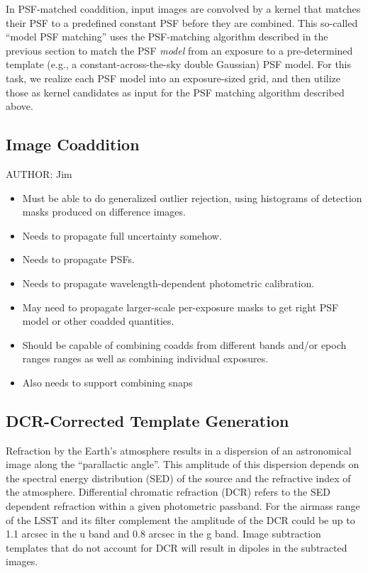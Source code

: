 In PSF-matched coaddition, input images are convolved by a kernel that matches their PSF to a predefined constant PSF before they are combined. This so-called ``model PSF matching'' uses the PSF-matching algorithm described in the previous section to match the PSF {\em   model} from an exposure to a pre-determined template (e.g., a constant-across-the-sky double Gaussian) PSF model. For this task, we realize each PSF model into an exposure-sized grid, and then utilize those as kernel candidates as input for the PSF matching algorithm described above. 

\subsection{Image Coaddition}
\label{sec:acCoaddition}
AUTHOR: Jim
\begin{itemize}
\item Must be able to do generalized outlier rejection, using histograms of detection masks produced on difference images.
\item Needs to propagate full uncertainty somehow.
\item Needs to propagate PSFs.
\item Needs to propagate wavelength-dependent photometric calibration.
\item May need to propagate larger-scale per-exposure masks to get right PSF model or other coadded quantities.
\item Should be capable of combining coadds from different bands and/or epoch ranges ranges as well as combining individual exposures.
\item Also needs to support combining snaps
\end{itemize}

\subsection{DCR-Corrected Template Generation}
\label{sec:acDCRTemplates}

Refraction by the Earth's atmosphere results in a dispersion of an
astronomical image along the ``parallactic angle''. This amplitude of
this dispersion depends on the spectral energy distribution (SED) of
the source and the refractive index of the atmosphere. Differential
chromatic refraction (DCR) refers to the SED dependent refraction
within a given photometric passband. For the airmass range of the LSST
and its filter complement the amplitude of the DCR could be up to 1.1
arcsec in the u band and 0.8 arcsec in the g band. Image subtraction
templates that do not account for DCR will result in dipoles in the
subtracted images.

